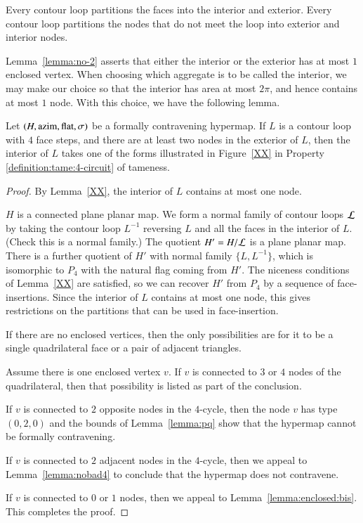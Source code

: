 Every contour loop partitions the faces into the interior and
exterior.  Every contour loop partitions the nodes that do not meet
the loop into exterior and interior nodes.
%

Lemma~\ref{lemma:no-2} asserts that either the interior or the
exterior has at most $1$ enclosed vertex.   When choosing which
aggregate is to be called the interior, we may make our choice so
that the interior has area at most $2\pi$, and hence contains at
most $1$ node. With this choice, we have the following lemma.

\begin{lemma}
Let $(H,{\operatorname{azim}},\operatorname{flat},\sigma)$ be a formally contravening hypermap. If
$L$ is a contour loop with $4$ face steps, and there are at least
two nodes in the exterior of $L$, then the interior of $L$ takes one
of the forms illustrated in Figure~\ref{XX} in Property
    \ref{definition:tame:4-circuit} of tameness.
\end{lemma}

\begin{proof}
By Lemma~\ref{XX}, the interior of $L$ contains at most one node.

$H$ is a connected plane planar map.  We form a normal family of
contour loops ${\cal L}$ by taking the contour loop $L^{-1}$
reversing $L$ and all the faces in the interior of $L$.
(Check this is a normal family.)  The quotient $H' = H/{\cal L}$ is
a plane planar map.  There is a further quotient of $H'$ with normal
family $\{L,L^{-1}\}$, which is isomorphic to $P_4$ with the natural
flag coming from $H'$.  The niceness conditions of Lemma~\ref{XX} are
satisfied, so we can recover $H'$ from $P_4$ by a sequence of
face-insertions.  Since the interior of $L$ contains at most one
node, this gives restrictions on the partitions that can be used in
face-insertion.

If there are no enclosed vertices, then the only possibilities are
for it to be a single quadrilateral face or a pair of adjacent
triangles.

Assume there is one enclosed vertex $v$.  If $v$ is connected to $3$
or $4$ nodes of the quadrilateral, then that possibility is listed
as part of the conclusion.

If $v$ is connected to $2$ opposite nodes in the $4$-cycle, then the
node $v$ has type $(0,2,0)$ and the bounds of
Lemma~\ref{lemma:pq} show that the hypermap cannot be formally
contravening.

If $v$ is connected to $2$ adjacent nodes in the $4$-cycle, then we
appeal to Lemma~\ref{lemma:nobad4} to conclude that the hypermap
does not contravene.

If $v$ is connected to $0$ or $1$ nodes, then we appeal to
Lemma~\ref{lemma:enclosed:bis}.  This completes the proof.
\end{proof}

